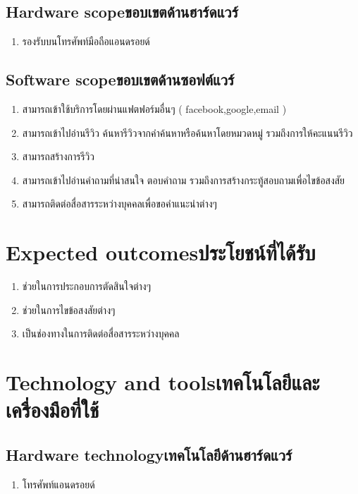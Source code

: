 \subsection{\ifenglish Hardware scope\else ขอบเขตด้านฮาร์ดแวร์\fi}
\begin{enumerate}
    \item รองรับบนโทรศัพท์มือถือแอนดรอยด์
\end{enumerate}
\subsection{\ifenglish Software scope\else ขอบเขตด้านซอฟต์แวร์\fi}
\begin{enumerate}
    \item สามารถเข้าใช้บริการโดยผ่านแฟตฟอร์มอื่นๆ ( facebook,google,email )
    \item สามารถเข้าไปอ่านรีวิว ค้นหารีวิวจากคําค้นหาหรือค้นหาโดยหมวดหมู่ รวมถึงการให้คะแนนรีวิว
    \item สามารถสร้างการรีวิว
    \item สามารถเข้าไปอ่านคําถามที่น่าสนใจ ตอบคําถาม รวมถึงการสร้างกระทู้สอบถามเพื่อไขข้อสงสัย
    \item สามารถติดต่อสื่อสารระหว่างบุคคลเพื่อขอคําแนะนําต่างๆ
\end{enumerate}
\section{\ifenglish Expected outcomes\else ประโยชน์ที่ได้รับ\fi}
\begin{enumerate}
    \item ช่วยในการประกอบการตัดสินใจต่างๆ
    \item ช่วยในการไขข้อสงสัยต่างๆ
    \item เป็นช่องทางในการติดต่อสื่อสารระหว่างบุคคล
\end{enumerate}
\section{\ifenglish Technology and tools\else เทคโนโลยีและเครื่องมือที่ใช้\fi}

\subsection{\ifenglish Hardware technology\else เทคโนโลยีด้านฮาร์ดแวร์\fi}
\begin{enumerate}
    \item โทรศัพท์แอนดรอยด์
\end{enumerate}
